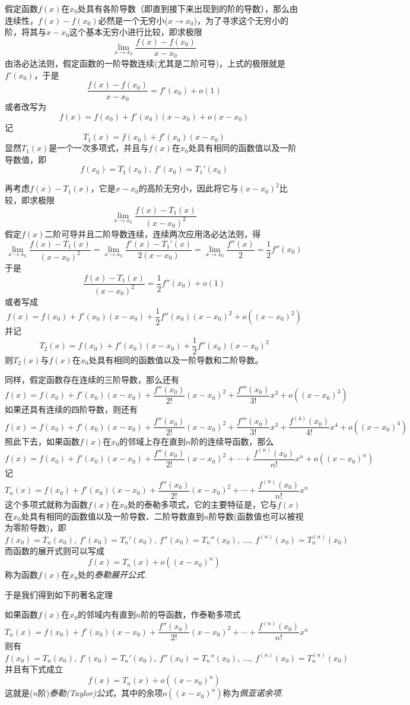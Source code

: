假定函数$f(x)$在$x_0$处具有各阶导数（即直到接下来出现到的阶的导数），那么由连续性，$f(x)-f(x_0)$必然是一个无穷小($x \to x_0$)，为了寻求这个无穷小的阶，将其与$x-x_0$这个基本无穷小进行比较，即求极限
\[ \lim_{x \to x_0} \frac{f(x)-f(x_0)}{x-x_0} \]
由洛必达法则，假定函数的一阶导数连续(尤其是二阶可导)，上式的极限就是$f'(x_0)$，于是
\[ \frac{f(x)-f(x_0)}{x-x_0} = f'(x_0) + o(1) \]
或者改写为
\[ f(x) = f(x_0) + f'(x_0) (x-x_0) + o(x-x_0) \]
记
\[ T_1(x) = f(x_0)+f'(x_0)(x-x_0) \]
显然$T_1(x)$是一个一次多项式，并且与$f(x)$在$x_0$处具有相同的函数值以及一阶导数值，即
\[ f(x_0) = T_1(x_0), \  f'(x_0) = T_1'(x_0) \]

再考虑$f(x)-T_1(x)$，它是$x-x_0$的高阶无穷小，因此将它与$(x-x_0)^2$比较，即求极限
\[ \lim_{x \to x_0} \frac{f(x)-T_1(x)}{(x-x_0)^2} \]
假定$f(x)$二阶可导并且二阶导数连续，连续两次应用洛必达法则，得
\[ \lim_{x \to x_0} \frac{f(x)-T_1(x)}{(x-x_0)^2} = \lim_{x \to x_0} \frac{f'(x)-T_1'(x)}{2(x-x_0)} = \lim_{x \to x_0} \frac{f''(x)}{2} = \frac{1}{2} f''(x_0) \]
于是
\[ \frac{f(x)-T_1(x)}{(x-x_0)^2} = \frac{1}{2}f''(x_0) + o(1) \]
或者写成
\[ f(x) = f(x_0) + f'(x_0)(x-x_0)+\frac{1}{2}f''(x_0)(x-x_0)^2 + o((x-x_0)^2) \]
并记
\[ T_2(x) =  f(x_0) + f'(x_0)(x-x_0)+\frac{1}{2}f''(x_0)(x-x_0)^2 \]
则$T_2(x)$与$f(x)$在$x_0$处具有相同的函数值以及一阶导数和二阶导数。

同样，假定函数存在连续的三阶导数，那么还有
\[ f(x) = f(x_0) + f'(x_0)(x-x_0)+\frac{f''(x_0)}{2!}(x-x_0)^2+\frac{f'''(x_0)}{3!}x^3 + o((x-x_0)^3) \]
如果还具有连续的四阶导数，则还有
\[ f(x) = f(x_0) + f'(x_0)(x-x_0)+\frac{f''(x_0)}{2!}(x-x_0)^2+\frac{f'''(x_0)}{3!}x^3+\frac{f^{(4)}(x_0)}{4!}x^4 + o((x-x_0)^4) \]
照此下去，如果函数$f(x)$在$x_0$的邻域上存在直到$n$阶的连续导函数，那么
\[ f(x) = f(x_0) + f'(x_0)(x-x_0)+\frac{f''(x_0)}{2!}(x-x_0)^2+ \cdots +\frac{f^{(n)}(x_0)}{n!}x^n + o((x-x_0)^n) \]
记
\[ T_n(x) = f(x_0) + f'(x_0)(x-x_0)+\frac{f''(x_0)}{2!}(x-x_0)^2+ \cdots +\frac{f^{(n)}(x_0)}{n!}x^n \]
这个多项式就称为函数$f(x)$在$x_0$处的泰勒多项式，它的主要特征是，它与$f(x)$在$x_0$处具有相同的函数值以及一阶导数、二阶导数直到$n$阶导数(函数值也可以被视为零阶导数)，即
\[ f(x_0)=T_n(x_0), \ f'(x_0) = T_n'(x_0), \  f''(x_0) = T_n''(x_0), \ \ldots, \  f^{(n)}(x_0) = T_n^{(n)}(x_0) \]
而函数的展开式则可以写成
\[ f(x) = T_n(x) + o((x-x_0)^n) \]
称为函数$f(x)$在$x_0$处的\emph{泰勒展开公式}.

于是我们得到如下的著名定理
\begin{theorem}[泰勒(Taylor)定理]
  如果函数$f(x)$在$x_0$的邻域内有直到$n$阶的导函数，作泰勒多项式
\[ T_n(x) = f(x_0) + f'(x_0)(x-x_0)+\frac{f''(x_0)}{2!}(x-x_0)^2+ \cdots +\frac{f^{(n)}(x_0)}{n!}x^n \]
则有
\[ f(x_0)=T_n(x_0), \ f'(x_0) = T_n'(x_0), \  f''(x_0) = T_n''(x_0), \ \ldots, \  f^{(n)}(x_0) = T_n^{(n)}(x_0) \]
并且有下式成立
\[ f(x) = T_n(x) + o((x-x_0)^n) \]
这就是($n$阶)\emph{泰勒(Taylor)公式}，其中的余项$o((x-x_0)^n)$称为\emph{佩亚诺余项}.
\end{theorem}

